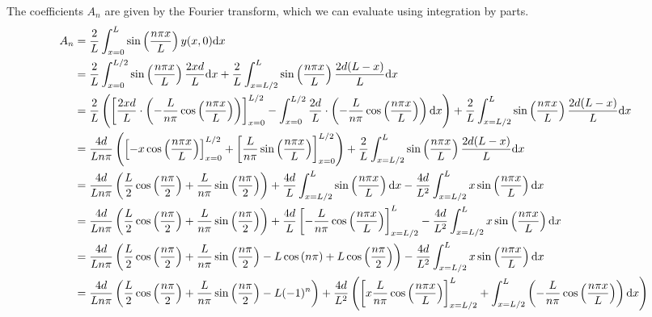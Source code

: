 \documentclass{article}
\begin{document}
\bigskip
\noindent{}\bigskip\par
The coefficients $A_n$ are given by the Fourier transform, which we can evaluate using integration by parts.
\begin{align*}
    A_n &= \frac{2}{L} \int_{x=0}^L \sin \left( \frac{n \pi x}{L} \right) y(x, 0) \d x \\
        &= \frac{2}{L} \int_{x=0}^{L/2} \sin \left( \frac{n \pi x}{L} \right) \frac{2xd}{L} \d x + \frac{2}{L} \int_{x=L/2}^L \sin \left( \frac{n \pi x}{L} \right) \frac{2d(L-x)}{L} \d x \\
        &= \frac{2}{L} \left( \left[ \frac{2xd}{L} \cdot \left( - \frac{L}{n \pi} \cos \left( \frac{n \pi x}{L} \right) \right) \right]_{x=0}^{L/2} - \int_{x=0}^{L/2} \frac{2d}{L} \cdot \left( - \frac{L}{n \pi} \cos \left( \frac{n \pi x}{L} \right) \right) \d x \right)  + \frac{2}{L} \int_{x=L/2}^L \sin \left( \frac{n \pi x}{L} \right) \frac{2d(L-x)}{L} \d x \\
        &= \frac{4d}{Ln \pi} \left( \left[ -x \cos \left( \frac{n \pi x}{L} \right) \right]_{x=0}^{L/2} + \left[ \frac{L}{n\pi} \sin \left( \frac{n \pi x}{L} \right) \right]_{x=0}^{L/2} \right)  + \frac{2}{L} \int_{x=L/2}^L \sin \left( \frac{n \pi x}{L} \right) \frac{2d(L-x)}{L} \d x \\
        &= \frac{4d}{Ln \pi} \left( \frac{L}{2} \cos \left( \frac{n\pi}{2} \right) + \frac{L}{n\pi} \sin \left( \frac{n \pi}{2} \right) \right) + \frac{4d}{L} \int_{x=L/2}^L \sin \left( \frac{n \pi x}{L} \right) \d x - \frac{4d}{L^2} \int_{x=L/2}^L x \sin \left( \frac{n \pi x}{L} \right) \d x  \\
        &= \frac{4d}{Ln \pi} \left( \frac{L}{2} \cos \left( \frac{n\pi}{2} \right) + \frac{L}{n\pi} \sin \left( \frac{n \pi}{2} \right) \right) + \frac{4d}{L} \left[ - \frac{L}{n \pi} \cos \left( \frac{n \pi x}{L} \right) \right]_{x=L/2}^L - \frac{4d}{L^2} \int_{x=L/2}^L x \sin \left( \frac{n \pi x}{L} \right)  \d x \\
        &= \frac{4d}{Ln \pi} \left( \frac{L}{2} \cos \left( \frac{n\pi}{2} \right) + \frac{L}{n\pi} \sin \left( \frac{n \pi}{2} \right) - L \cos \left( n \pi \right) + L \cos \left( \frac{n\pi}{2} \right) \right) - \frac{4d}{L^2} \int_{x=L/2}^L x \sin \left( \frac{n \pi x}{L} \right) \d x  \\
        &= \frac{4d}{Ln \pi} \left( \frac{L}{2} \cos \left( \frac{n\pi}{2} \right) + \frac{L}{n\pi} \sin \left( \frac{n \pi}{2} \right) - L (-1)^n \right) + \frac{4d}{L^2} \left( \left[ x \frac{L}{n\pi} \cos \left( \frac{n \pi x}{L} \right) \right]_{x=L/2}^L + \int_{x=L/2}^L \left( - \frac{L}{n\pi} \cos \left( \frac{n \pi x}{L} \right) \right) \d x\right)  \\

\end{align*}
\end{document}
